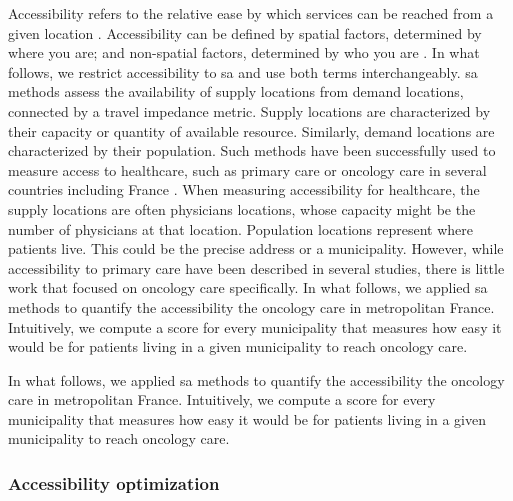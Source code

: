 Accessibility refers to the relative ease by which services can be reached from
a given location \cite{wang_measurement_2012}. Accessibility can be defined by
spatial factors, determined by where you are; and non-spatial factors,
determined by who you are \cite{khan_integrated_1992}. In what follows, we
restrict accessibility to \acf{sa} and use both terms interchangeably. \ac{sa}
methods assess the availability of supply locations from demand locations,
connected by a travel impedance metric. Supply locations are characterized by
their capacity or quantity of available resource. Similarly, demand locations
are characterized by their population. Such methods have been successfully used
to measure access to healthcare, such as primary care
\cite{guagliardo_spatial_2004} or oncology care
\cite{wang_measurement_2012,zahnd_spatial_2021,alahmadi_spatial_2013} in several
countries including France
\cite{launay_methodology_2019,gusmano_disparities_2014,gao_assessment_2016}.
When measuring accessibility for healthcare, the supply locations are often
physicians locations, whose capacity might be the number of physicians at that
location. Population locations represent where patients live. This could be
the precise address or a municipality. However, while accessibility to primary
care have been described in several studies, there is little work that focused
on oncology care specifically. In what follows, we applied \ac{sa} methods to
quantify the accessibility the oncology care in metropolitan France.
Intuitively, we compute a score for every municipality that measures how easy
it would be for patients living in a given municipality to reach oncology care.

In what follows, we applied \ac{sa} methods to
quantify the accessibility the oncology care in metropolitan France.
Intuitively, we compute a score for every municipality that measures how easy it
would be for patients living in a given municipality to reach oncology care.

\subsubsection{Accessibility optimization}

